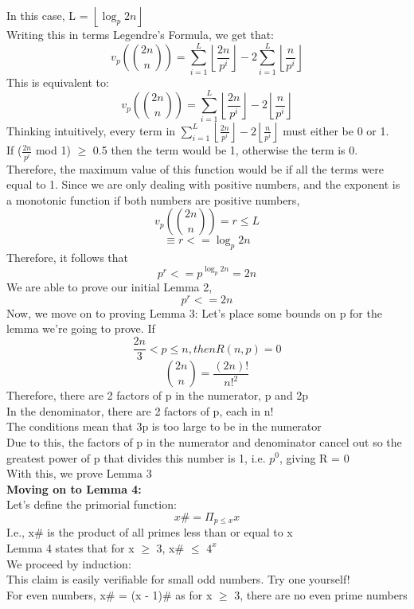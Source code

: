 \documentclass[conference]{IEEEtran}
\begin{document}
In this case, L = $\left\lfloor \log_{p}{2n} \right\rfloor$\\ Writing this in terms Legendre's Formula, we get that:
\[
    v_{p}({2n \choose n}) = \sum_{i = 1}^{L} {\left\lfloor \frac{2n}{p^i} \right\rfloor} - 2\sum_{i = 1}^{L} {\left\lfloor \frac{n}{p^i} \right\rfloor}
\]
This is equivalent to:
\[
    v_{p}({2n \choose n}) = \sum_{i = 1}^{L} {\left\lfloor \frac{2n}{p^i} \right\rfloor - 2\left\lfloor \frac{n}{p^i} \right\rfloor}
\]
Thinking intuitively, every term in $\sum_{i = 1}^{L} {\left\lfloor \frac{2n}{p^i} \right\rfloor - 2\left\lfloor \frac{n}{p^i} \right\rfloor}$ must either be 0 or 1.\\
If ($\frac{2n}{p^i}$ mod 1) $\geq$ 0.5 then the term would be 1, otherwise the term is 0. Therefore, the maximum value of this function would be if all the terms were equal to 1. Since we are only dealing with positive numbers, and the exponent is a monotonic function if both numbers are positive numbers,
\[
    v_{p}({2n \choose n}) = r \leq L
\]
\[
    \equiv r <= \log_{p}{2n}
\]
Therefore, it follows that
\[
    p^r <= p^{\log_{p}{2n}} = 2n
\]
We are able to prove our initial Lemma 2, 
\[
    p^r <= 2n
\]
Now, we move on to proving Lemma 3:
Let's place some bounds on p for the lemma we're going to prove. If 
\[
    \frac{2n}{3} < p \leq n, then R(n, p) = 0
\]
\[
    {{2n} \choose {n}} = \frac{(2n)!}{{n!}^2}
\]
Therefore, there are 2 factors of p in the numerator, p and 2p\\
In the denominator, there are 2 factors of p, each in n!\\
The conditions mean that 3p is too large to be in the numerator\\
Due to this, the factors of p in the numerator and denominator cancel out so the greatest power of p that divides this number is 1, i.e. $p^0$, giving R = 0\\
With this, we prove Lemma 3\\
\textbf{Moving on to Lemma 4:}\\
Let's define the primorial function:
\[
    x\# = \Pi_{p \leq x} x
\]
I.e., x\# is the product of all primes less than or equal to x\\
Lemma 4 states that for x $\geq$ 3,  x\# $\leq$ $4^x$\\
We proceed by induction:\\
This claim is easily verifiable for small odd numbers. Try one yourself!\\
For even numbers, x\# = (x - 1)\# as for x $\geq$ 3, there are no even prime numbers\\
\end{document}
